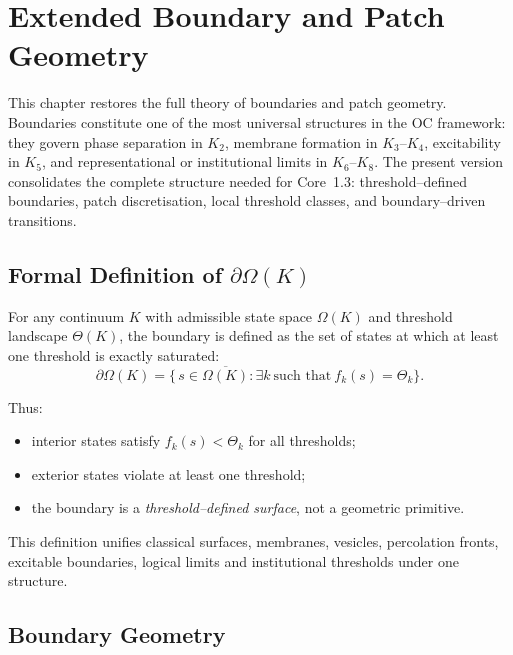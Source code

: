 
\section{Extended Boundary and Patch Geometry}
\label{sec:boundary-extended}

This chapter restores the full theory of boundaries and patch geometry.
Boundaries constitute one of the most universal structures in the OC framework:
they govern phase separation in \(K_2\), membrane formation in \(K_3\)--\(K_4\),
excitability in \(K_5\), and representational or institutional limits in
\(K_6\)--\(K_8\).  
The present version consolidates the complete structure needed for Core~1.3:
threshold–defined boundaries, patch discretisation, local threshold classes,
and boundary–driven transitions.

\subsection{Formal Definition of \texorpdfstring{$\partial\Omega(K)$}{boundary}}

For any continuum \(K\) with admissible state space \(\Omega(K)\) and threshold
landscape \(\Theta(K)\), the boundary is defined as the set of states at which
at least one threshold is exactly saturated:
\[
  \partial\Omega(K)
  =
  \big\{\, s \in \overline{\Omega(K)} :
          \exists k\ \text{such that}\ f_k(s) = \Theta_k \big\}.
\]

Thus:
\begin{itemize}
    \item interior states satisfy \(f_k(s) < \Theta_k\) for all thresholds;
    \item exterior states violate at least one threshold;
    \item the boundary is a \emph{threshold–defined surface}, not a geometric
          primitive.
\end{itemize}

This definition unifies classical surfaces, membranes, vesicles,
percolation fronts, excitable boundaries, logical limits and institutional
thresholds under one structure.

\subsection{Boundary Geometry}

